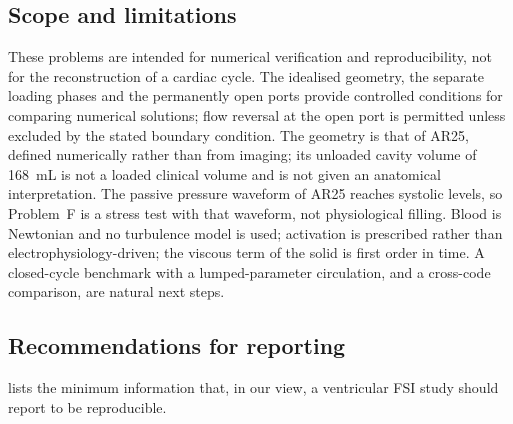 \subsection{Scope and limitations}
These problems are intended for numerical verification and
reproducibility, not for the reconstruction of a cardiac cycle. The
idealised geometry, the separate loading phases and the permanently open
ports provide controlled conditions for comparing numerical solutions;
flow reversal at the open port is permitted unless excluded by the stated
boundary condition. The geometry is that of AR25, defined numerically
rather than from imaging; its unloaded cavity volume of \SI{168}{mL} is
not a loaded clinical volume and is not given an anatomical
interpretation. The passive pressure waveform of AR25 reaches systolic
levels, so Problem~F is a stress test with that waveform, not physiological
filling. Blood is Newtonian and no turbulence model is used; activation is
prescribed rather than electrophysiology-driven; the viscous term of the
solid is first order in time. A closed-cycle benchmark with a
lumped-parameter circulation, and a cross-code comparison, are natural
next steps.

\subsection{Recommendations for reporting}
 lists the minimum information that, in our view, a
ventricular FSI study should report to be reproducible.

